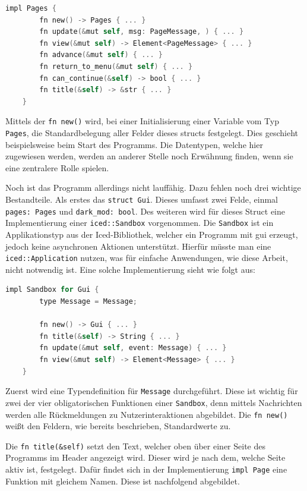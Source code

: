 \begin{lstlisting}[language=C]
    impl Pages {
        fn new() -> Pages { ... }
        fn update(&mut self, msg: PageMessage, ) { ... }
        fn view(&mut self) -> Element<PageMessage> { ... }
        fn advance(&mut self) { ... }
        fn return_to_menu(&mut self) { ... }
        fn can_continue(&self) -> bool { ... }
        fn title(&self) -> &str { ... }
    }
\end{lstlisting}

Mittels der \lstinline{fn new()} wird, bei einer Initialisierung einer Variable vom Typ \lstinline{Pages}, die Standardbelegung aller Felder dieses structs festgelegt. 
Dies geschieht beispielsweise beim Start des Programms. Die Datentypen, welche hier zugewiesen werden,
werden an anderer Stelle noch Erwähnung finden, wenn sie eine zentralere Rolle spielen.

Noch ist das Programm allerdings nicht lauffähig. Dazu fehlen noch drei wichtige Bestandteile. Als erstes das \lstinline{struct Gui}. Dieses umfasst zwei Felde, einmal 
\lstinline{pages: Pages} und \lstinline{dark_mod: bool}. Des weiteren wird für dieses Struct eine Implementierung einer \lstinline{iced::Sandbox} vorgenommen.
Die \lstinline{Sandbox} ist ein Applikationstyp aus der Iced-Bibliothek, welcher ein Programm mit \ac{gui} erzeugt, jedoch keine asynchronen Aktionen unterstützt. Hierfür müsste man
eine \lstinline{iced::Application} nutzen, was für einfache Anwendungen, wie diese Arbeit, nicht notwendig ist. Eine solche Implementierung sieht wie folgt aus:

\begin{lstlisting}[language=C]
    impl Sandbox for Gui {
        type Message = Message;

        fn new() -> Gui { ... }
        fn title(&self) -> String { ... }
        fn update(&mut self, event: Message) { ... }
        fn view(&mut self) -> Element<Message> { ... }
    }
\end{lstlisting}

Zuerst wird eine Typendefinition für \lstinline{Message} durchgeführt. Diese ist wichtig für zwei der vier obligatorischen Funktionen einer \lstinline{Sandbox}, denn 
mittels Nachrichten werden alle Rückmeldungen zu Nutzerinteraktionen abgebildet. Die \lstinline{fn new()} weißt den Feldern, wie bereits beschrieben, Standardwerte zu.

Die \lstinline{fn title(&self)} setzt den Text, welcher oben über einer Seite des Programms im Header angezeigt wird. Dieser wird je nach dem, welche Seite aktiv ist,
festgelegt. Dafür findet sich in der Implementierung \lstinline{impl Page} eine Funktion mit gleichem Namen. Diese ist nachfolgend abgebildet.


